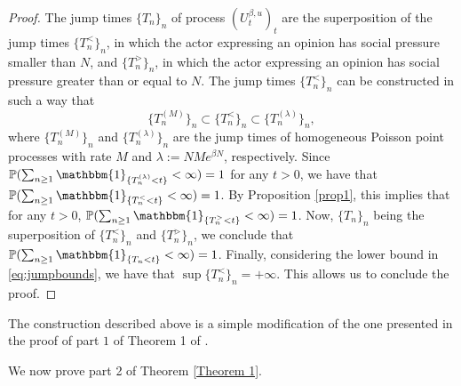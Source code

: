 \documentclass[11pt]{article}
\theoremstyle{definition}
\begin{document}
\begin{proof}
The jump times $\{T_n\}_n$ of process $(U^{\beta,u}_t)_t$ are the superposition of the jump times $\{T^<_n\}_n$, in which the actor expressing an opinion has social pressure smaller than $N$, and $\{T^>_n\}_n$, in which the actor expressing an opinion has social pressure greater than or equal to $N$. The jump times $\{T^<_n\}_n$ can be constructed in such a way that 
\begin{equation} \label{eq:jumpbounds}
\{T^{(M)}_n\}_n \subset\{T^<_n\}_n \subset \{T^{(\lambda)}_n\}_n,   
\end{equation}
where $\{T^{(M)}_n\}_n$ and $\{T^{(\lambda)}_n\}_n$ are the jump times of homogeneous Poisson point processes with rate $M$ and $\lambda:=NMe^{\beta N}$, respectively. Since 
$\mathbb{P}(\sum_{n\geq 1} \mathbbm{1}_{\{T_n^{(\lambda)} <t\}} <\infty)=1$ for any $t>0$, we have that $\mathbb{P}(\sum_{n\geq 1} \mathbbm{1}_{\{T_n^{<} <t\}} <\infty)=1$.
By Proposition \ref{prop1}, this implies that for any $t>0$, 
$\mathbb{P}(\sum_{n\geq 1} \mathbbm{1}_{\{T_n^> <t\}} <\infty)=1$.
Now, $\{T_n\}_n$ being the superposition of $\{T^<_n\}_n$ and $\{T^>_n\}_n$, we conclude that $\mathbb{P}(\sum_{n\geq 1} \mathbbm{1}_{\{T_n <t\}} <\infty)=1$.
Finally, considering the lower bound in \eqref{eq:jumpbounds}, we have that $\sup \{T^<_n\}_n=+\infty$. This allows us to conclude the proof.
\end{proof}

The construction described above is a simple modification of the one presented in the proof of part $1$ of Theorem 1 of \cite{galves2024fastconsensusmetastabilityhighly}.




We now prove part 2 of Theorem \ref{Theorem 1}.
\end{document}
